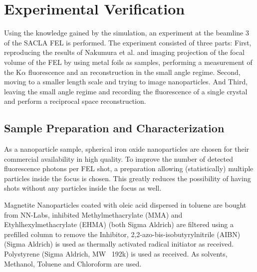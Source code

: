 \chapter{Experimental Verification}
\label{chap:experiment}
Using the knowledge gained by the simulation, an experiment at the beamline 3 of the SACLA FEL is performed. The experiment consisted of three parts: First, reproducing the results of Nakumura et al. and imaging projection of the focal volume of the FEL by using metal foils as samples, performing a measurement of the K$\alpha$  fluorescence and an reconstruction in the small angle regime. Second, moving to a smaller length scale and trying to image nanoparticles. And Third, leaving the small angle regime and recording the fluorescence of a single crystal and perform a reciprocal space reconstruction.
\section{Sample Preparation and Characterization}
As a nanoparticle sample, spherical iron oxide nanoparticles are chosen for their commercial availability in high quality. To improve the number of detected fluorescence photons per FEL shot, a preparation allowing (statistically) multiple particles inside the focus is chosen. This greatly reduces the possibility of having shots without any particles inside the focus as well.

Magnetite Nanoparticles coated with oleic acid dispersed in toluene are bought from NN-Labs, inhibited Methylmethacrylate (MMA) and Etyhlhexylmethacrylate (EHMA)  (both Sigma Aldrich) are filtered using a prefilled column to remove the Inhibitor,  2,2-azo-bis-isobutyrylnitrile (AIBN) (Sigma Aldrich) is used as thermally activated radical initiator as received. Polystyrene (Sigma Aldrich, MW ~192k) is used as received. As solvents, Methanol, Toluene and Chloroform are used.
